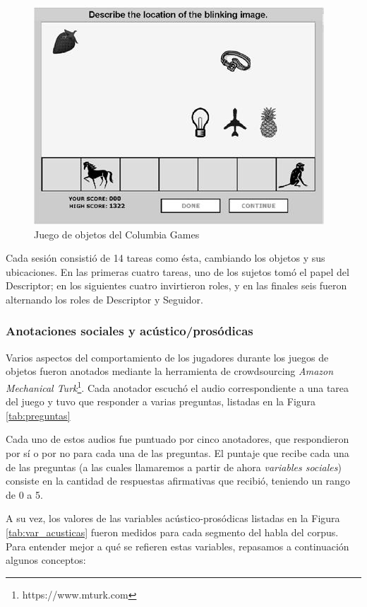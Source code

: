 \begin{figure}[t]
\centering
\includegraphics[scale=0.35]{images/columbia_games.jpg}
\caption{Juego de objetos del Columbia Games}
\label{objects_game}
\end{figure}


Cada sesión consistió de 14 tareas como ésta, cambiando los objetos y sus ubicaciones. En las primeras cuatro tareas, uno de los sujetos tomó el papel del Descriptor; en los siguientes cuatro invirtieron roles, y en las finales seis fueron alternando los roles de Descriptor y Seguidor.

\subsubsection{Anotaciones sociales y acústico/prosódicas}

Varios aspectos del comportamiento de los jugadores durante los juegos de objetos fueron anotados mediante la herramienta de crowdsourcing \emph{Amazon Mechanical Turk}\footnote{https://www.mturk.com}. Cada anotador escuchó el audio correspondiente a una tarea del juego y tuvo que responder a varias preguntas, listadas en la Figura \ref{tab:preguntas}

Cada uno de estos audios fue puntuado por cinco anotadores, que respondieron por sí o por no para cada una de las preguntas. El puntaje que recibe cada una de las preguntas (a las cuales llamaremos a partir de ahora \emph{variables sociales}) consiste en la cantidad de respuestas afirmativas que recibió, teniendo un rango de 0 a 5.

A su vez, los valores de las variables acústico-prosódicas listadas en la Figura \ref{tab:var_acusticas} fueron medidos para cada segmento del habla del corpus. Para entender mejor a qué se refieren estas variables, repasamos a continuación algunos conceptos:

